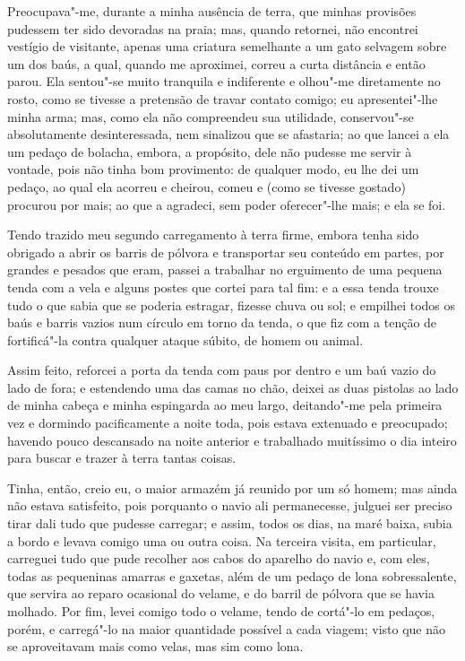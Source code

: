 Preocupava"-me, durante a minha ausência de terra, que minhas provisões
pudessem ter sido devoradas na praia; mas, quando retornei, não
encontrei vestígio de visitante, apenas uma criatura semelhante a um
gato selvagem sobre um dos baús, a qual, quando me aproximei, correu a
curta distância e então parou. Ela sentou"-se muito tranquila e
indiferente e olhou"-me diretamente no rosto, como se tivesse a pretensão
de travar contato comigo; eu apresentei"-lhe minha arma; mas, como ela
não compreendeu sua utilidade, conservou"-se absolutamente
desinteressada, nem sinalizou que se afastaria; ao que lancei a ela um
pedaço de bolacha, embora, a propósito, dele não pudesse me servir à
vontade, pois não tinha bom provimento: de qualquer modo, eu lhe dei um
pedaço, ao qual ela acorreu e cheirou, comeu e (como se tivesse gostado)
procurou por mais; ao que a agradeci, sem poder oferecer"-lhe mais; e ela
se foi.

Tendo trazido meu segundo carregamento à terra firme, embora tenha sido
obrigado a abrir os barris de pólvora e transportar seu conteúdo em
partes, por grandes e pesados que eram, passei a trabalhar no erguimento
de uma pequena tenda com a vela e alguns postes que cortei para tal fim:
e a essa tenda trouxe tudo o que sabia que se poderia estragar, fizesse
chuva ou sol; e empilhei todos os baús e barris vazios num círculo em
torno da tenda, o que fiz com a tenção de fortificá"-la contra qualquer
ataque súbito, de homem ou animal.

Assim feito, reforcei a porta da tenda com paus por dentro e um baú
vazio do lado de fora; e estendendo uma das camas no chão, deixei as
duas pistolas ao lado de minha cabeça e minha espingarda ao meu largo,
deitando"-me pela primeira vez e dormindo pacificamente a noite toda,
pois estava extenuado e preocupado; havendo pouco descansado na noite
anterior e trabalhado muitíssimo o dia inteiro para buscar e trazer à
terra tantas coisas.

Tinha, então, creio eu, o maior armazém já reunido por um só homem; mas
ainda não estava satisfeito, pois porquanto o navio ali permanecesse,
julguei ser preciso tirar dali tudo que pudesse carregar; e assim, todos
os dias, na maré baixa, subia a bordo e levava comigo uma ou outra
coisa. Na terceira visita, em particular, carreguei tudo que pude
recolher aos cabos do aparelho do navio e, com eles, todas as pequeninas
amarras e gaxetas, além de um pedaço de lona sobressalente, que servira
ao reparo ocasional do velame, e do barril de pólvora que se havia
molhado. Por fim, levei comigo todo o velame, tendo de cortá"-lo em
pedaços, porém, e carregá"-lo na maior quantidade possível a cada viagem;
visto que não se aproveitavam mais como velas, mas sim como lona.


